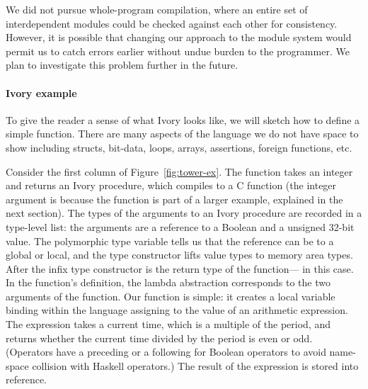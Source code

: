 We did not pursue whole-program compilation, where an entire set of
interdependent modules could be checked against each other for consistency.
However, it is possible that changing our approach to the module system would
permit us to catch errors earlier without undue burden to the programmer. We
plan to investigate this problem further in the future.

\paragraph{Ivory example}
To give the reader a sense of what Ivory looks like, we will sketch how to
define a simple function.  There are many aspects of the language we do not have
space to show including structs, bit-data, loops, arrays, assertions, foreign
functions, etc.

Consider the first column of Figure~\ref{fig:tower-ex}.  The function takes an
integer and returns an Ivory procedure, which compiles to a C function (the
integer argument is because the function is part of a larger example, explained
in the next section).  The types of the arguments to an Ivory procedure are
recorded in a type-level list: the arguments are a reference to a Boolean and a
unsigned 32-bit value.  The polymorphic type variable  tells us that the
reference can be to a global or local, and the  type constructor
lifts value types to memory area types.  After the infix type constructor
\cd{:->} is the return type of the function--- in this case.  In the
function's definition, the lambda abstraction corresponds to the two arguments
of the function.  Our function is simple: it creates a local variable binding
within the language assigning to  the value of an arithmetic
expression.  The expression takes a current time, which is a multiple of the
period, and returns whether the current time divided by the period is even or
odd.  (Operators have a preceding  or a following  for Boolean
operators to avoid name-space collision with Haskell operators.)  The result of
the expression is stored into  reference.




